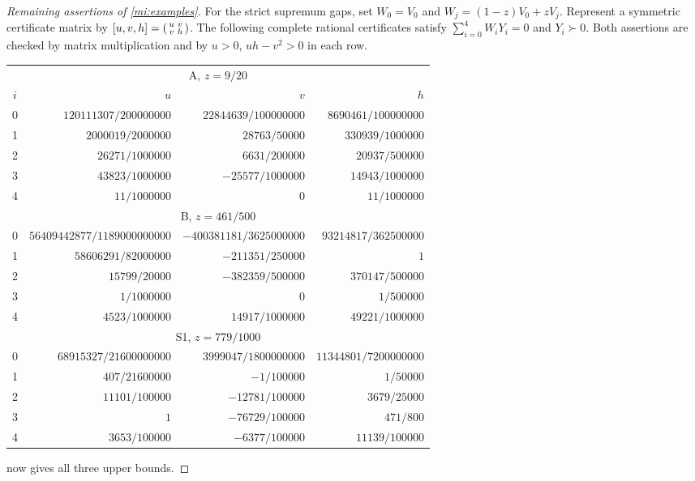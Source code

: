 \begin{proof}[Remaining assertions of \cref{mi:examples}]
For the strict supremum gaps, set
$W_0=V_0$ and $W_j=(1-z)V_0+zV_j$.
Represent a symmetric certificate matrix by
$[u,v,h]=\begin{psmallmatrix}u&v\\v&h\end{psmallmatrix}$.
The following complete rational certificates satisfy
$\sum_{i=0}^4W_iY_i=0$ and $Y_i\succ0$.
Both assertions are checked by matrix multiplication and by
$u>0$, $uh-v^2>0$ in each row.
\begin{center}\small
\begin{tabular}{c r r r}
\toprule
\multicolumn{4}{c}{A, $z=9/20$}\\
$i$&$u$&$v$&$h$\\\midrule
0&$120111307/200000000$&$22844639/100000000$&$8690461/100000000$\\
1&$2000019/2000000$&$28763/50000$&$330939/1000000$\\
2&$26271/1000000$&$6631/200000$&$20937/500000$\\
3&$43823/1000000$&$-25577/1000000$&$14943/1000000$\\
4&$11/1000000$&$0$&$11/1000000$\\\midrule
\multicolumn{4}{c}{B, $z=461/500$}\\
0&$56409442877/1189000000000$&$-400381181/3625000000$&$93214817/362500000$\\
1&$58606291/82000000$&$-211351/250000$&$1$\\
2&$15799/20000$&$-382359/500000$&$370147/500000$\\
3&$1/1000000$&$0$&$1/500000$\\
4&$4523/1000000$&$14917/1000000$&$49221/1000000$\\\midrule
\multicolumn{4}{c}{S1, $z=779/1000$}\\
0&$68915327/21600000000$&$3999047/1800000000$&$11344801/7200000000$\\
1&$407/21600000$&$-1/100000$&$1/50000$\\
2&$11101/100000$&$-12781/100000$&$3679/25000$\\
3&$1$&$-76729/100000$&$471/800$\\
4&$3653/100000$&$-6377/100000$&$11139/100000$\\
\bottomrule
\end{tabular}
\end{center}
 now gives all three upper bounds.


\end{proof}
